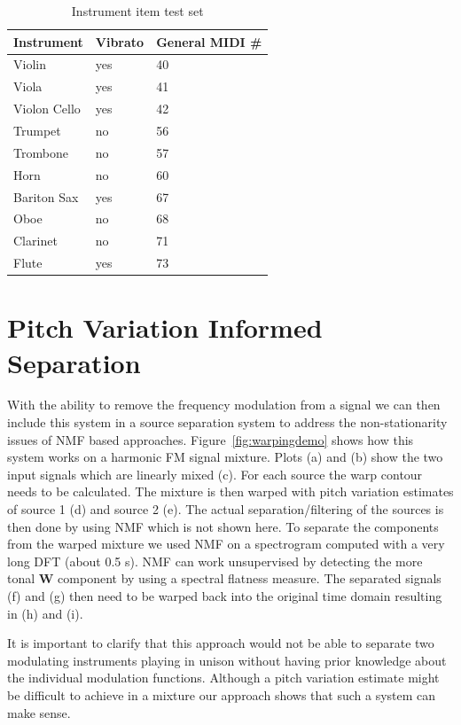 \begin{table}
\begin{center}
\footnotesize
\begin{tabular}{ l l l}
  Instrument & Vibrato &  General MIDI \# \\
  \hline
  Violin & yes & 40 \\
  Viola & yes & 41 \\
  Violon Cello & yes & 42 \\
  Trumpet & no & 56 \\
  Trombone & no & 57\\
  Horn & no & 60  \\
  Bariton Sax & yes & 67 \\ %
  Oboe & no & 68\\
  Clarinet & no & 71\\
  Flute & yes & 73\\
\end{tabular}
\end{center}
\caption{Instrument item test set}
\label{tab:testset}
\end{table}

\section{Pitch Variation Informed Separation} %
\label{ssub:pitch_variation_informed_source_separation}

With the ability to remove the frequency modulation from a signal we can then include this system in a source separation system to address the non-stationarity issues of NMF based approaches. Figure~\ref{fig:warpingdemo} shows how this system works on a harmonic FM signal mixture. Plots (a) and (b) show the two input signals which are linearly mixed (c). For each source the warp contour needs to be calculated. The mixture is then warped with pitch variation estimates of source 1  (d) and source 2 (e). The actual separation/filtering of the sources is then done by using NMF which is not shown here. To separate the components from the warped mixture we used NMF on a spectrogram computed with a very long DFT (about 0.5 s). NMF can work unsupervised by detecting the more tonal $\textbf{W}$ component by using a spectral flatness measure. The separated signals (f) and (g) then need to be warped back into the original time domain resulting in (h) and (i).

It is important to clarify that this approach would not be able to separate two modulating instruments playing in unison without having prior knowledge about the individual modulation functions. Although a pitch variation estimate might be difficult to achieve in a mixture our approach shows that such a system can make sense.

